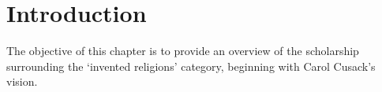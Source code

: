 \documentclass[Draft.tex]{subfiles}
\begin{document}

\section*{Introduction}
The objective of this chapter is to provide an overview
of the scholarship surrounding the `invented religions' category,
beginning with Carol Cusack's \parencite*{Cusack13} vision.
\end{document}
